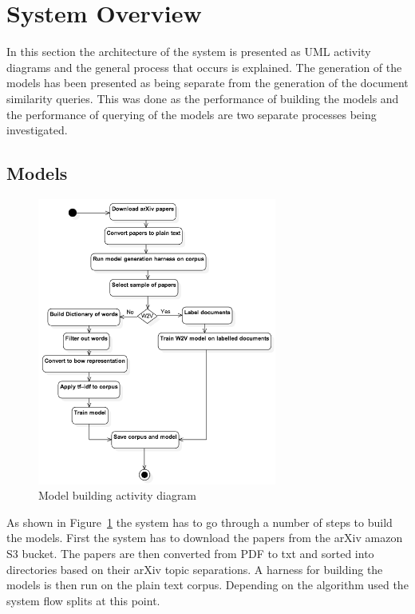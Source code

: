 \section{System Overview}
In this section the architecture of the system is presented as UML activity diagrams and the general process that occurs is explained.
The generation of the models has been presented as being separate from the generation of the document similarity queries.
This was done as the performance of building the models and the performance of querying of the models are two separate processes being investigated.

\subsection{Models}
\begin{figure}[h]
    \centering
        \includegraphics[width=0.7\textwidth]{Figures/ArchictectureBuildingUML.png}
    \caption{Model building activity diagram}
    \label{fig:buildUML}
\end{figure}
As shown in Figure~\ref{fig:buildUML} the system has to go through a number of steps to build the models.
First the system has to download the papers from the arXiv amazon S3 bucket.
The papers are then converted from PDF to txt and sorted into directories based on their arXiv topic separations.
A harness for building the models is then run on the plain text corpus.
Depending on the algorithm used the system flow splits at this point.

